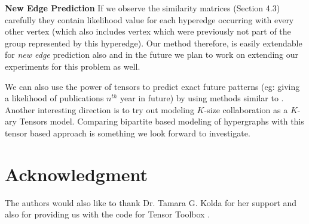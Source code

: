 \documentclass{sig-alternate}
\begin{document}
\textbf{New Edge Prediction} If we observe the similarity matrices (Section 4.3) carefully they contain likelihood value for each hyperedge occurring with every other vertex (which also includes vertex which were previously not part of the group represented by this hyperedge). Our method therefore, is easily extendable for \textit{new edge} prediction also and in the future we plan to work on extending our experiments for this problem as well. 

We can also use the power of tensors to predict exact future patterns (eg: giving a likelihood of publications $n^{th}$ year in future) by using methods similar to \cite{kolda11}. Another interesting direction is to try out modeling $K$-size collaboration as a $K$-ary Tensors model. Comparing bipartite based modeling of hypergraphs with this tensor based approach is something we look forward to investigate.


\section*{Acknowledgment}

The authors would also like to thank Dr. Tamara G. Kolda for her support and also for providing us with the code for Tensor Toolbox \cite{kolda07}. 


%


\end{document}
